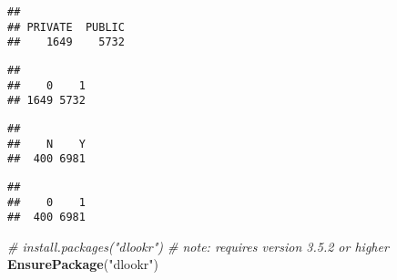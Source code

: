\documentclass[]{article}
\newenvironment{Shaded}{\begin{snugshade}}{\end{snugshade}}
\newcommand{\CommentTok}[1]{\textcolor[rgb]{0.56,0.35,0.01}{\textit{#1}}}
\newcommand{\KeywordTok}[1]{\textcolor[rgb]{0.13,0.29,0.53}{\textbf{#1}}}
\newcommand{\NormalTok}[1]{#1}
\newcommand{\OperatorTok}[1]{\textcolor[rgb]{0.81,0.36,0.00}{\textbf{#1}}}
\newcommand{\StringTok}[1]{\textcolor[rgb]{0.31,0.60,0.02}{#1}}
\begin{document}
\begin{Shaded}
\end{Shaded}

\begin{verbatim}
## 
## PRIVATE  PUBLIC 
##    1649    5732
\end{verbatim}

\begin{Shaded}
\end{Shaded}

\begin{verbatim}
## 
##    0    1 
## 1649 5732
\end{verbatim}

\begin{Shaded}
\end{Shaded}

\begin{verbatim}
## 
##    N    Y 
##  400 6981
\end{verbatim}

\begin{Shaded}
\end{Shaded}

\begin{verbatim}
## 
##    0    1 
##  400 6981
\end{verbatim}

\begin{Shaded}
\begin{Highlighting}[]
\CommentTok{# install.packages("dlookr")  # note: requires version 3.5.2 or higher}
\KeywordTok{EnsurePackage}\NormalTok{(}\StringTok{"dlookr"}\NormalTok{)}
\end{Highlighting}
\end{Shaded}
\end{document}
